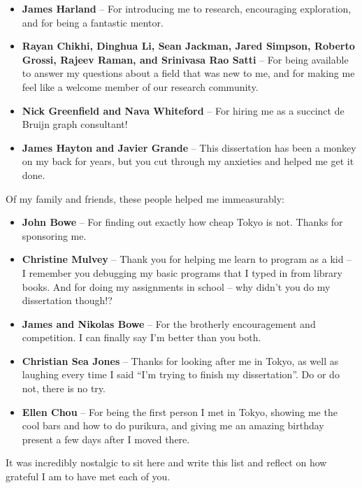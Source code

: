 \begin{itemize}
\item \textbf{James Harland} -- For introducing me to research, encouraging exploration, and for being a fantastic mentor.
\item \textbf{Rayan Chikhi, Dinghua Li, Sean Jackman, Jared Simpson, Roberto Grossi, Rajeev Raman, and Srinivasa Rao Satti} -- For being available to answer my questions about a field that was new to me, and for making me feel like a welcome member of our research community.
\item \textbf{Nick Greenfield and Nava Whiteford} -- For hiring me as a succinct de Bruijn graph consultant!
\item \textbf{James Hayton and Javier Grande} -- This dissertation has been a monkey on my back for years, but you cut through my anxieties and helped me get it done.
\end{itemize}

\noindent
Of my family and friends, these people helped me immeasurably:

\begin{itemize}
\item \textbf{John Bowe} -- For finding out exactly how cheap Tokyo is not. Thanks for sponsoring me.
\item \textbf{Christine Mulvey} -- Thank you for helping me learn to program as a kid -- I remember you debugging my basic programs that I typed in from library books. And for doing my assignments in school -- why didn’t you do my dissertation though!?
\item \textbf{James and Nikolas Bowe} -- For the brotherly encouragement and competition. I can finally say I’m better than you both.
\item \textbf{Christian Sea Jones} -- Thanks for looking after me in Tokyo, as well as laughing every time I said “I’m trying to finish my dissertation”. Do or do not, there is no try.
\item \textbf{Ellen Chou} -- For being the first person I met in Tokyo, showing me the cool bars and how to do purikura, and giving me an amazing birthday present a few days after I moved there.
\end{itemize}

\noindent
It was incredibly nostalgic to sit here and write this list and reflect on how grateful I am to have met each of you.
